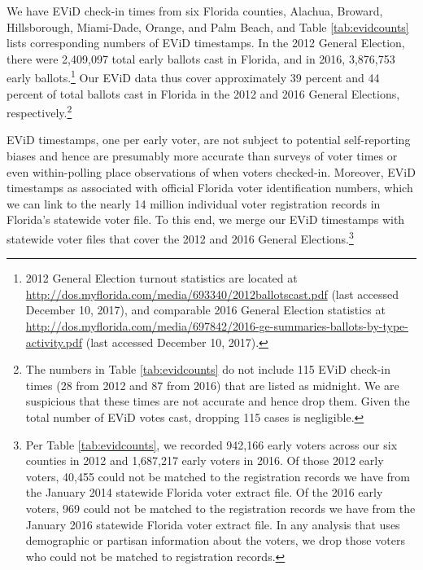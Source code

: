 \documentclass[12pt,titlepage]{article}
\begin{document}
We have EViD check-in times from six Florida counties, Alachua,
Broward, Hillsborough, Miami-Dade, Orange, and Palm Beach, and Table
\ref{tab:evidcounts} lists corresponding numbers of EViD timestamps.
In the 2012 General Election, there were 2,409,097 total early ballots
cast in Florida, and in 2016, 3,876,753 early ballots.\footnote{2012
  General Election turnout statistics are located at
  \url{http://dos.myflorida.com/media/693340/2012ballotscast.pdf}
  (last accessed December 10, 2017), and comparable 2016 General
  Election statistics at
  \url{http://dos.myflorida.com/media/697842/2016-ge-summaries-ballots-by-type-activity.pdf}
  (last accessed December 10, 2017).}  Our EViD data thus cover
approximately 39 percent and 44 percent of total ballots cast in
Florida in the 2012 and 2016 General Elections,
respectively.\footnote{The numbers in Table \ref{tab:evidcounts} do
  not include 115 EViD check-in times (28 from 2012 and 87 from 2016)
  that are listed as midnight.  We are suspicious that these times are
  not accurate and hence drop them.  Given the total number of EViD
  votes cast, dropping 115 cases is negligible.\label{fn:midnight}}





EViD timestamps, one per early voter, are not subject to potential
self-reporting biases and hence are presumably more accurate than
surveys of voter times or even within-polling place observations of
when voters checked-in.  Moreover, EViD timestamps as associated with
official Florida voter identification numbers, which we can link to
the nearly 14 million individual voter registration records in
Florida's statewide voter file.  To this end, we merge our EViD
timestamps with statewide voter files that cover the 2012 and 2016
General Elections.\footnote{Per Table \ref{tab:evidcounts}, we
  recorded 942,166 early voters across our six counties in 2012 and
  1,687,217 early voters in 2016.  Of those 2012 early voters, 40,455
  could not be matched to the registration records we have from the
  January 2014 statewide Florida voter extract file.  Of the 2016
  early voters, 969 could not be matched to the registration records
  we have from the January 2016 statewide Florida voter extract file.
  In any analysis that uses demographic or partisan information about
  the voters, we drop those voters who could not be matched to
  registration records.}
\end{document}
